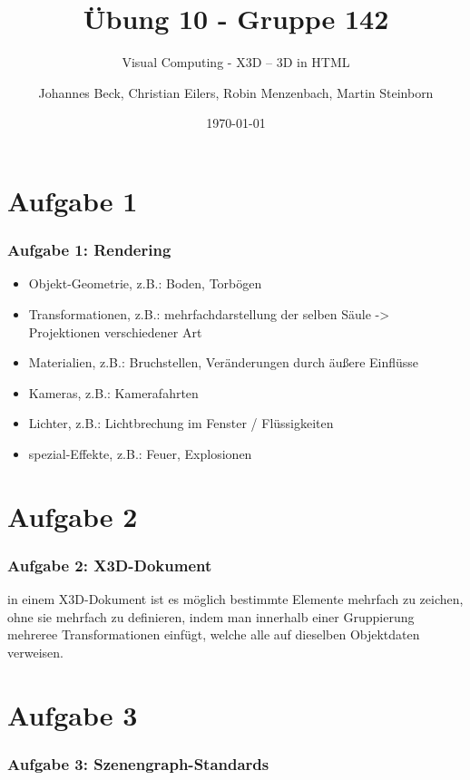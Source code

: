\documentclass[accentcolor=tud9c,colorbacktitle,inverttitle,landscape,german,presentation,t]{tudbeamer}
\begin{document}
\title{\"Ubung 10 - Gruppe 142} 
\subtitle{Visual Computing - X3D – 3D in HTML} 

\author[Johannes Beck, Christian Eilers, Robin Menzenbach, Martin Steinborn]{Johannes Beck, Christian Eilers, Robin Menzenbach, Martin Steinborn}


\date{\today}

\begin{titleframe}
\end{titleframe}

\section{Aufgabe 1}
	\begin{frame}
		\frametitle{Aufgabe 1: Rendering}
		\begin{itemize}
			\item Objekt-Geometrie, z.B.: Boden, Torbögen
			\item Transformationen, z.B.: mehrfachdarstellung der selben Säule -> Projektionen verschiedener Art
			\item Materialien, z.B.: Bruchstellen, Veränderungen durch äußere Einflüsse
			\item Kameras, z.B.: Kamerafahrten
			\item Lichter, z.B.: Lichtbrechung im Fenster / Flüssigkeiten
			\item spezial-Effekte, z.B.: Feuer, Explosionen
		\end{itemize}
	\end{frame}

\section{Aufgabe 2}
\begin{frame}
	\frametitle{Aufgabe 2: X3D-Dokument}
	in einem X3D-Dokument ist es möglich bestimmte Elemente mehrfach zu zeichen, ohne sie mehrfach zu definieren, indem man innerhalb einer Gruppierung mehreree Transformationen einfügt, welche alle auf dieselben Objektdaten verweisen.
\end{frame}

\section{Aufgabe 3}
\begin{frame}
	\frametitle{Aufgabe 3: Szenengraph-Standards}
\end{frame}
\end{document}
